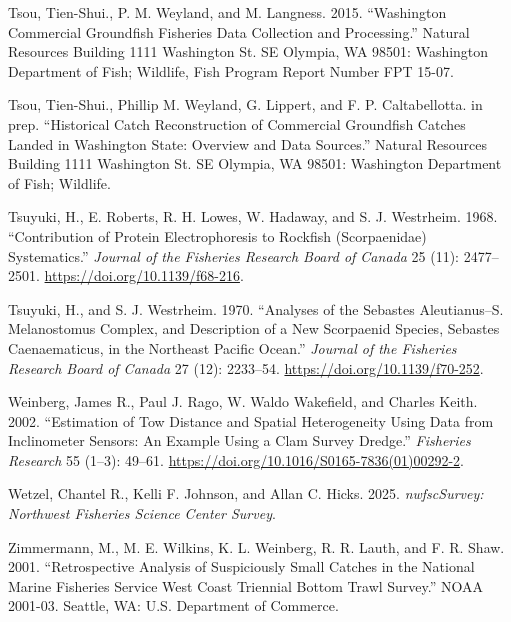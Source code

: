 \documentclass[
]{scrartcl}
\newlength{\cslhangindent}
\newenvironment{CSLReferences}[2] %
 {\begin{list}{}{%
  \setlength{\itemindent}{0pt}
  \setlength{\leftmargin}{0pt}
  \setlength{\parsep}{0pt}
  \ifodd #1
   \setlength{\leftmargin}{\cslhangindent}
   \setlength{\itemindent}{-1\cslhangindent}
  \fi
  \setlength{\itemsep}{#2\baselineskip}}}
 {\end{list}}
\begin{document}
\begin{CSLReferences}{1}{0}
Tsou, Tien-Shui., P. M. Weyland, and M. Langness. 2015. {``Washington
Commercial Groundfish Fisheries Data Collection and Processing.''}
Natural Resources Building 1111 Washington St. SE Olympia, WA 98501:
Washington Department of Fish; Wildlife, Fish Program Report Number FPT
15-07.

Tsou, Tien-Shui., Phillip M. Weyland, G. Lippert, and F. P.
Caltabellotta. in prep. {``Historical Catch Reconstruction of Commercial
Groundfish Catches Landed in Washington State: Overview and Data
Sources.''} Natural Resources Building 1111 Washington St. SE Olympia,
WA 98501: Washington Department of Fish; Wildlife.

Tsuyuki, H., E. Roberts, R. H. Lowes, W. Hadaway, and S. J. Westrheim.
1968. {``Contribution of {Protein} {Electrophoresis} to {Rockfish}
({Scorpaenidae}) {Systematics}.''} \emph{Journal of the Fisheries
Research Board of Canada} 25 (11): 2477--2501.
\url{https://doi.org/10.1139/f68-216}.

Tsuyuki, H., and S. J. Westrheim. 1970. {``Analyses of the {Sebastes}
Aleutianus--{S}. Melanostomus {Complex}, and {Description} of a New
{Scorpaenid} {Species}, {Sebastes} Caenaematicus, in the {Northeast}
{Pacific} {Ocean}.''} \emph{Journal of the Fisheries Research Board of
Canada} 27 (12): 2233--54. \url{https://doi.org/10.1139/f70-252}.

Weinberg, James R., Paul J. Rago, W. Waldo Wakefield, and Charles Keith.
2002. {``Estimation of Tow Distance and Spatial Heterogeneity Using Data
from Inclinometer Sensors: An Example Using a Clam Survey Dredge.''}
\emph{Fisheries Research} 55 (1--3): 49--61.
\url{https://doi.org/10.1016/S0165-7836(01)00292-2}.

Wetzel, Chantel R., Kelli F. Johnson, and Allan C. Hicks. 2025.
\emph{nwfscSurvey: Northwest Fisheries Science Center Survey}.

Zimmermann, M., M. E. Wilkins, K. L. Weinberg, R. R. Lauth, and F. R.
Shaw. 2001. {``Retrospective Analysis of Suspiciously Small Catches in
the {N}ational {M}arine {F}isheries {S}ervice West Coast Triennial
Bottom Trawl Survey.''} NOAA 2001-03. Seattle, WA: {U}.{S}. Department
of Commerce.

\end{CSLReferences}
\end{document}
